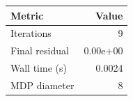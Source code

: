 \begin{tabular}{lr}
\hline
Metric & Value \\
\hline
Iterations & 9 \\
Final residual & 0.00e+00 \\
Wall time (s) & 0.0024 \\
MDP diameter & 8 \\
\hline
\end{tabular}